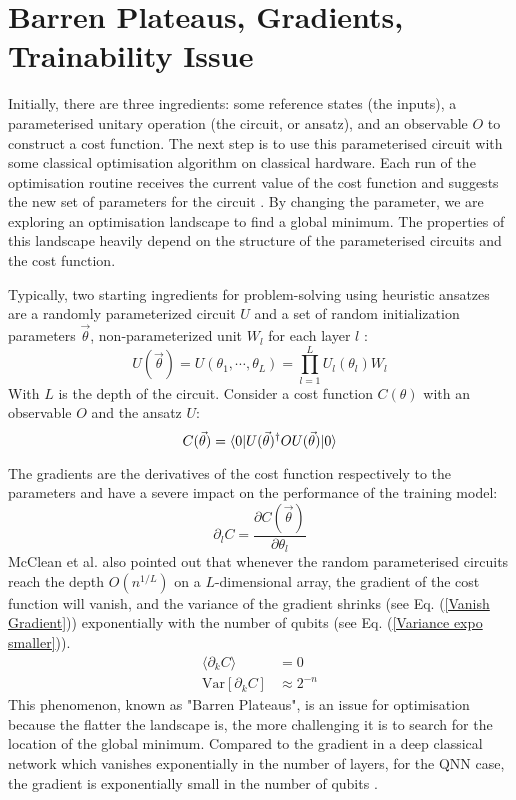 \section{Barren Plateaus, Gradients, Trainability Issue}
Initially, there are three ingredients: some reference states (the inputs), a parameterised unitary operation (the circuit, or ansatz), and an observable $O$ to construct a cost function.
The next step is to use this parameterised circuit with some classical optimisation algorithm on classical hardware.
Each run of the optimisation routine receives the current value of the cost function and suggests the new set of parameters for the circuit \cite{cerezo2021variational}.
By changing the parameter, we are exploring an optimisation landscape to find a global minimum.
The properties of this landscape heavily depend on the structure of the parameterised circuits and the cost function.

Typically, two starting ingredients for problem-solving using heuristic ansatzes are a randomly parameterized circuit $U$ and a set of random initialization parameters $\vec{\theta}$, non-parameterized unit $W_l$ for each layer $l$ \cite{mccleanBarrenPlateausQuantum2018}:
\begin{equation}\label{Parameterized Circuit}
    U(\vec{\theta})
    = U(\theta_1, \cdots, \theta_L)
    = \prod_{l=1}^L U_l(\theta_l)W_l
\end{equation}
With $L$ is the depth of the circuit. Consider a cost function $C(\theta)$ with an observable $O$ and the ansatz $U$:
\begin{equation}
    C(\vec{\theta})
    = \bra{0} U(\vec{\theta})^\dagger OU(\vec{\theta}) \ket{0}
\end{equation}

The gradients are the derivatives of the cost function respectively to the parameters and have a severe impact on the performance of the training model:
\begin{equation}
    \partial_l C = \frac{\partial C(\vec{\theta})}{\partial\theta_l}
\end{equation}
McClean et al.\cite{mccleanBarrenPlateausQuantum2018} also pointed out that whenever the random parameterised circuits reach the depth $O(n^{1/L})$ on a $L$-dimensional array, the gradient of the cost function will vanish, and the variance of the gradient shrinks (see Eq. (\ref{Vanish Gradient})) exponentially with the number of qubits (see Eq. (\ref{Variance expo smaller})).
\begin{align}
    \langle \partial_k C\rangle &= 0  \label{Vanish Gradient}\\
    \mathrm{Var}[\partial_k C] &\approx 2^{-n}  \label{Variance expo smaller}
\end{align}
This phenomenon, known as "Barren Plateaus", is an issue for optimisation because the flatter the landscape is, the more challenging it is to search for the location of the global minimum.
Compared to the gradient in a deep classical network which vanishes exponentially in the number of layers, for the QNN case, the gradient is exponentially small in the number of qubits \cite{mccleanBarrenPlateausQuantum2018}.

